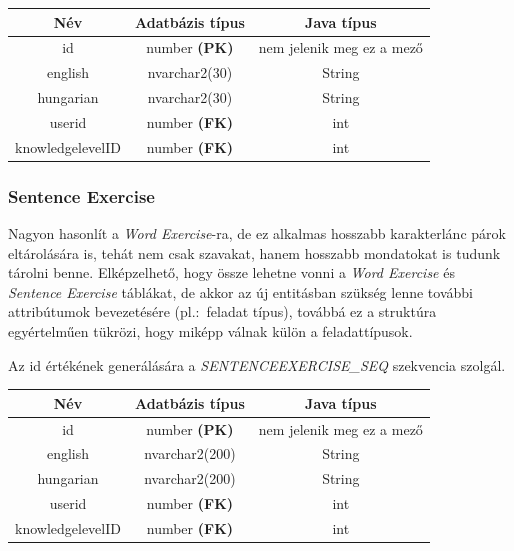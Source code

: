 \documentclass[11pt, a4paper]{article}
\begin{document}
    \begin{table}[!h]
    	\centering
    	\begin{tabular} {|c|c|c|}
    		\hline
    		Név & Adatbázis típus & Java típus \\
    		\hline
    		id & number \textbf{(PK)} & nem jelenik meg ez a mező \\
    		english & nvarchar2(30) & String \\
    		hungarian & nvarchar2(30) & String \\
    		userid & number \textbf{(FK)} & int \\
    		knowledgelevelID & number \textbf{(FK)} & int \\
    		\hline
    	\end{tabular}
    \end{table}
    
    \subsubsection{Sentence Exercise}
    Nagyon hasonlít a \textit{Word Exercise}-ra, de ez alkalmas hosszabb karakterlánc párok eltárolására is, tehát nem csak szavakat, hanem hosszabb mondatokat is tudunk tárolni benne. Elképzelhető, hogy össze lehetne vonni a \textit{Word Exercise} és \textit{Sentence Exercise} táblákat, de akkor az új entitásban szükség lenne további attribútumok bevezetésére (pl.:~feladat típus), továbbá ez a struktúra egyértelműen tükrözi, hogy miképp válnak külön a feladattípusok.
    
    Az id értékének generálására a \textit{SENTENCEEXERCISE\_SEQ} szekvencia szolgál.
    
    \begin{table}[!h]
    	\centering
    	\begin{tabular} {|c|c|c|}
    		\hline
    		Név & Adatbázis típus & Java típus \\
    		\hline
    		id & number \textbf{(PK)} & nem jelenik meg ez a mező \\
    		english & nvarchar2(200) & String \\
    		hungarian & nvarchar2(200) & String \\
    		userid & number \textbf{(FK)} & int \\
    		knowledgelevelID & number \textbf{(FK)} & int \\
    		\hline
    	\end{tabular}
    \end{table}
    
\end{document}
